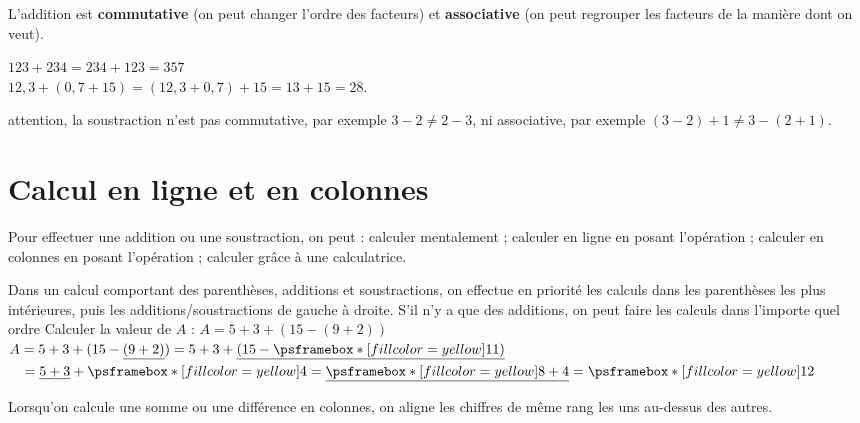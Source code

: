 \begin{propriete}
   L'addition est {\bf commutative} (on peut changer l’ordre des facteurs) et {\bf associative} (on peut regrouper les facteurs de la manière dont on veut).
\end{propriete}

\begin{exemple*1}
   $123+234 =234+123 =357$ \\
      $12,3+(0,7+15) =(12,3+0,7)+15 =13+15 =28$.
\end{exemple*1}

\begin{remarque}
   attention, la soustraction n'est pas commutative, par exemple $3-2 \neq2-3$, ni associative, par exemple $(3-2)+1 \neq3-(2+1)$.
\end{remarque}


\section{Calcul en ligne et en colonnes}

Pour effectuer une addition ou une soustraction, on peut : calculer mentalement ; calculer en ligne en posant l'opération ; calculer en colonnes en posant l'opération ; calculer grâce à une calculatrice.

\begin{methode}
   Dans un calcul comportant des parenthèses, additions et soustractions, on effectue en priorité les calculs dans les parenthèses les plus intérieures, puis les additions/soustractions de gauche à droite. S'il n'y a que des additions, on peut faire les calculs dans l'importe quel {\small ordre}
   \exercice
   Calculer la valeur de $A$ :
   $A =5+3+(15-(9+2))$ \\
   \correction
      $A =5+3+(15-\underline{(9+2)}) =5+3+\underline{(15-\psframebox*[fillcolor=yellow]{11})}$ \\
      $\phantom{A} =\underline{5+3}+\psframebox*[fillcolor=yellow]{4} =\underline{\psframebox*[fillcolor=yellow]{8}+4} =\psframebox*[fillcolor=yellow]{12}$
\end{methode}
 
\begin{propriete}
   Lorsqu'on calcule une somme ou une différence en colonnes, on aligne les chiffres de même rang les uns au-dessus des autres.
\end{propriete}

